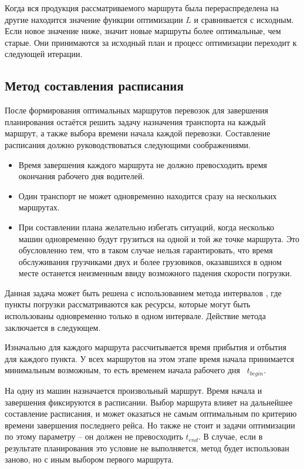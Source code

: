 	Когда вся продукция рассматриваемого маршрута была перераспределена на другие находится значение функции оптимизации $L$ и сравнивается с исходным. Если новое значение ниже, значит новые маршруты более оптимальные, чем старые. Они принимаются за исходный план и процесс оптимизации переходит к следующей итерации.

\subsection{Метод составления расписания}
После формирования оптимальных маршрутов перевозок для завершения планирования остаётся решить задачу назначения транспорта на каждый маршрут, а также выбора времени начала каждой перевозки. Составление расписания должно руководствоваться следующими соображениями.

\begin{itemize}
	\item Время завершения каждого маршрута не должно превосходить время \, окончания рабочего дня водителей.
	\item Один транспорт не может одновременно находится сразу на нескольких маршрутах.
	\item При составлении плана желательно избегать ситуаций, когда несколько машин одновременно будут грузиться на одной и той же точке маршрута. Это обусловленно тем, что в таком случае нельзя гарантировать, что время обслуживания грузчиками двух и более грузовиков, оказавшихся в одном месте останется неизменным ввиду возможного падения скорости погрузки.
\end{itemize}

Данная задача может быть решена с использованием метода интервалов \cite{schedule:intervals}, где пункты погрузки рассматриваются как ресурсы, которые могут быть использованы одновременно только в одном интервале. Действие метода заключается в следующем.

Изначально для каждого маршрута рассчитывается время прибытия и отбытия для каждого пункта. У всех маршрутов на этом этапе время начала принимается минимальным возможным, то есть временем начала рабочего дня \, $t_{begin}$.

На одну из машин назначается произвольный маршрут. Время начала и завершения фиксируются в расписании. Выбор маршрута влияет на дальнейшее составление расписания, и может оказаться не самым оптимальным по критерию времени завершения последнего рейса. Но также не стоит и задачи оптимизации по этому параметру -- он должен не превосходить $t_{end}$. В случае, если в результате планирования это условие не выполняется, метод будет использован заново, но с иным выбором первого маршрута.

